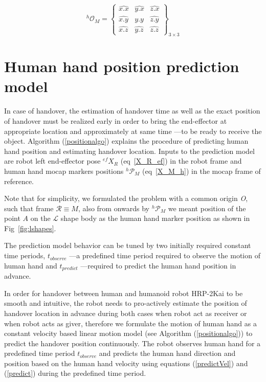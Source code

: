 \begin{equation}\label{rotationmatrix}
{}^{h}\mathcal{O}_{M} = 
\left\{\begin{array}{cccc}
\hat{x.x} & \hat{y.x} & \hat{z.x} \\
\hat{x.y} & \hat{y.y} & \hat{z.y} \\
\hat{x.z} & \hat{y.z} & \hat{z.z}
\end{array}\right\}_{3\times 3}
\end{equation}



\clearpage

\section{Human hand position prediction model}\label{prediction_model}

In case of handover, the estimation of handover time as well as the exact position of handover must be realized early in order to bring the end-effector at appropriate location and approximately at same time ---to be ready to receive the object. Algorithm (\ref{positionalgo}) explains the procedure of predicting human hand position and estimating handover location. Inputs to the prediction model are robot left end-effector pose $\mathcal{}^{ef}{X}_R$ (eq~\ref{X_R_ef}) in the robot frame and human hand mocap markers positions ${}^{h}\mathcal{P}_M$ (eq~\ref{X_M_h}) in the mocap frame of reference.

Note that for simplicity, we formulated the problem with a common origin {\it O}, such that frame $\mathcal R \equiv M$, also from onwards by ${}^{h}\mathcal{P}_M$ we meant position of the point $A$ on the $\mathcal{L}$ shape body as the human hand marker position as shown in Fig~\ref{fig:lshapes}.


The prediction model behavior can be tuned by two initially required constant time periods, $t_{observe}$ ---a predefined time period required to observe the motion of human hand and $t_{predict}$ ---required to predict the human hand position in advance.


In order for handover between human and humanoid robot HRP-2Kai to be smooth and intuitive, the robot needs to pro-actively estimate the position of handover location in advance during both cases when robot act as receiver or when robot acts as giver, therefore we formulate the motion of human hand as a constant velocity based linear motion model (see Algorithm (\ref{positionalgo})) to predict the handover position continuously. The robot observes human hand for a predefined time period $t_{observe}$ and predicts the human hand direction and position based on the human hand velocity using equations (\ref{predictVel}) and (\ref{predict}) during the predefined time period. 

